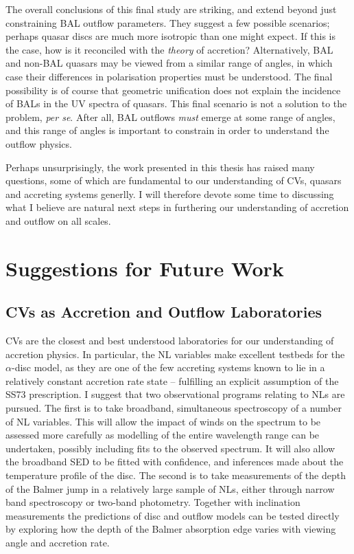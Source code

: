 The overall conclusions of this final study are striking, and extend 
beyond just constraining BAL outflow parameters. 
They suggest a few possible scenarios; perhaps quasar discs are much
more isotropic than one might expect. If this is the case, how is it
reconciled with the {\em theory} of accretion? Alternatively, BAL and
non-BAL quasars may be viewed from a similar range of angles, in 
which case their differences in polarisation properties must be 
understood. The final possibility is of course that geometric unification
does not explain the incidence of BALs in the UV spectra of quasars.
This final scenario is not a solution to the problem, {\sl per se}. After all, BAL
outflows {\em must} emerge at some range of angles, and this range of 
angles is important to constrain in order to understand the outflow physics.

Perhaps unsurprisingly, the work presented in this thesis has raised 
many questions, some of which are fundamental to our understanding of CVs, 
quasars and accreting systems generlly. I
will therefore devote some time to discussing what I believe are 
natural next steps in furthering our understanding of accretion
and outflow on all scales.

\section{Suggestions for Future Work}

\subsection{CVs as Accretion and Outflow Laboratories}

CVs are the closest and best understood laboratories for
our understanding of accretion physics. In particular, the NL
variables make excellent testbeds for the $\alpha$-disc model,
as they are one of the few accreting systems known to
lie in a relatively constant accretion rate state -- fulfilling 
an explicit assumption of the SS73 prescription. I suggest
that two observational programs relating to NLs are pursued.
The first is to take broadband, simultaneous spectroscopy of a number
of NL variables. This will allow the impact of winds on the spectrum
to be assessed more carefully as modelling of the entire wavelength
range can be undertaken, possibly including fits to the observed spectrum.
It will also allow the broadband SED to be fitted with confidence,
and inferences made about the temperature profile of the disc. 
The second is to take measurements of the depth of the Balmer jump
in a relatively large sample of NLs, either through narrow band spectroscopy
or two-band photometry. Together with inclination measurements the predictions
of disc and outflow models can be tested directly by exploring how the depth
of the Balmer absorption edge varies with viewing angle and accretion rate.

